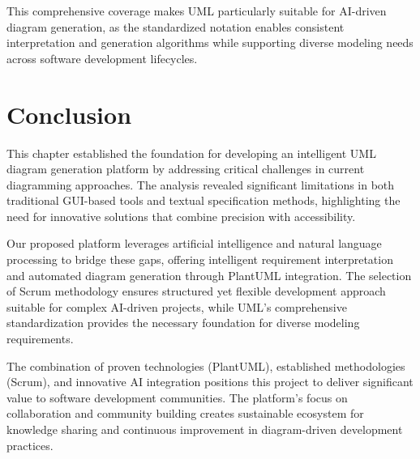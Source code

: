 This comprehensive coverage makes UML particularly suitable for AI-driven diagram generation, as the standardized notation enables consistent interpretation and generation algorithms while supporting diverse modeling needs across software development lifecycles.

\section{Conclusion}

This chapter established the foundation for developing an intelligent UML diagram generation platform by addressing critical challenges in current diagramming approaches. The analysis revealed significant limitations in both traditional GUI-based tools and textual specification methods, highlighting the need for innovative solutions that combine precision with accessibility.

Our proposed platform leverages artificial intelligence and natural language processing to bridge these gaps, offering intelligent requirement interpretation and automated diagram generation through PlantUML integration. The selection of Scrum methodology ensures structured yet flexible development approach suitable for complex AI-driven projects, while UML's comprehensive standardization provides the necessary foundation for diverse modeling requirements.

The combination of proven technologies (PlantUML), established methodologies (Scrum), and innovative AI integration positions this project to deliver significant value to software development communities. The platform's focus on collaboration and community building creates sustainable ecosystem for knowledge sharing and continuous improvement in diagram-driven development practices.
